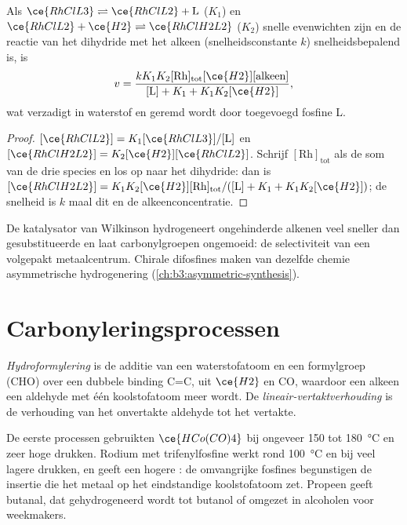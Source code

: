 \begin{proposition}\label{prop:b3:homogeneous-catalysis:wilkinson-rate}
Als $\ce{RhClL3} \rightleftharpoons \ce{RhClL2} + \mathrm L$ ($K_1$) en $\ce{RhClL2} + \ce{H2} \rightleftharpoons \ce{RhClH2L2}$ ($K_2$) snelle
evenwichten zijn en de reactie van het dihydride met het alkeen (snelheidsconstante $k$)
snelheidsbepalend is, is
\[
  v = \frac{kK_1K_2[\mathrm{Rh}]_{\mathrm{tot}}[\ce{H2}][\text{alkeen}]}{[\mathrm L] + K_1 + K_1K_2[\ce{H2}]},
\]
wat verzadigt in waterstof en geremd wordt door toegevoegd fosfine L.
\end{proposition}

\begin{proof}
$[\ce{RhClL2}] = K_1[\ce{RhClL3}]/[\mathrm L]$ en $[\ce{RhClH2L2}] = K_2[\ce{H2}][\ce{RhClL2}]$. Schrijf $[\mathrm{Rh}]_{\mathrm{tot}}$ als de
som van de drie species en los op naar het dihydride: dan is $[\ce{RhClH2L2}] =
K_1K_2[\ce{H2}][\mathrm{Rh}]_{\mathrm{tot}}/([\mathrm L] + K_1 + K_1K_2[\ce{H2}])$; de snelheid is $k$ maal dit en de
alkeenconcentratie.
\end{proof}

De katalysator van Wilkinson hydrogeneert ongehinderde alkenen veel
sneller dan gesubstitueerde en laat carbonylgroepen ongemoeid: de
selectiviteit van een volgepakt metaalcentrum. Chirale difosfines maken
van dezelfde chemie asymmetrische hydrogenering
(\cref{ch:b3:asymmetric-synthesis}).

\section{Carbonyleringsprocessen}

\begin{definition}[Hydroformylering]\label{def:b3:homogeneous-catalysis:hydroformylation}
\emph{Hydroformylering} is de additie van een
waterstofatoom en een formylgroep (CHO) over een dubbele binding C=C, uit $\ce{H2}$ en CO, waardoor een
alkeen een aldehyde met één koolstofatoom meer wordt. De
\emph{lineair-vertaktverhouding} is de
verhouding van het onvertakte aldehyde tot het vertakte.
\end{definition}

De eerste processen gebruikten $\ce{HCo(CO)4}$ bij ongeveer 150 tot \qty{180}{\celsius} en zeer hoge
drukken. Rodium met trifenylfosfine werkt rond \qty{100}{\celsius} en bij
veel lagere drukken, en geeft een hogere : de
omvangrijke fosfines begunstigen de insertie die het metaal op het
eindstandige koolstofatoom zet.
Propeen geeft butanal, dat gehydrogeneerd wordt tot butanol of omgezet
in alcoholen voor weekmakers.

